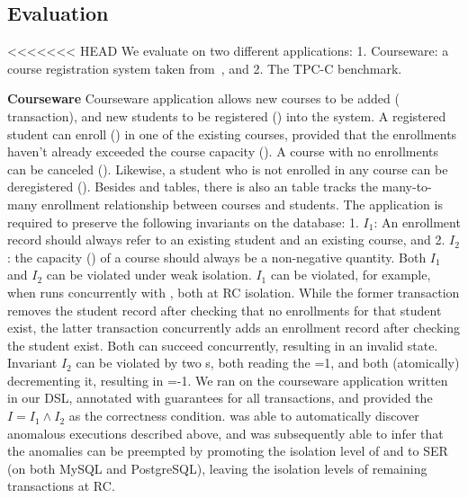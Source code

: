 \subsection{Evaluation}

<<<<<<< HEAD
We evaluate \tool on two different applications: 1. Courseware: a
course registration system taken from~\cite{gotsmanpopl16}, and
2. The TPC-C benchmark. 

\textbf{Courseware} Courseware application allows new courses to be
added ( transaction), and new students to be
registered () into the system. A registered
student can enroll () in one of the existing courses,
provided that the enrollments haven't already exceeded the course
capacity (). A course with no enrollments can be
canceled (). Likewise, a student who is not enrolled
in any course can be deregistered (). Besides
 and  tables, there is also an 
table tracks the many-to-many enrollment relationship between courses
and students. The application is required to preserve the following
invariants on the database: 1.  $I_1$: An enrollment record should
always refer to an existing student and an existing course, and 2.
$I_2$: the capacity () of a course should always be a
non-negative quantity. Both $I_1$ and $I_2$ can be violated under weak
isolation. $I_1$ can be violated, for example, when
 runs concurrently with , both at RC
isolation. While the former transaction removes the student record
after checking that no enrollments for that student exist, the latter
transaction concurrently adds an enrollment record after checking the
student exist. Both can succeed concurrently, resulting in an invalid
state. Invariant $I_2$ can be violated by two s, both
reading the =1, and both (atomically) decrementing it,
resulting in =-1.  We ran \tool on the courseware
application written in our DSL, annotated with guarantees for all
transactions, and provided the $I = I_1 \wedge I_2$ as the correctness
condition. \tool was able to automatically discover anomalous
executions described above, and was subsequently able to infer that
the anomalies can be preempted by promoting the isolation level of
 and  to SER (on both MySQL and
PostgreSQL), leaving the isolation levels of remaining transactions at
RC.

